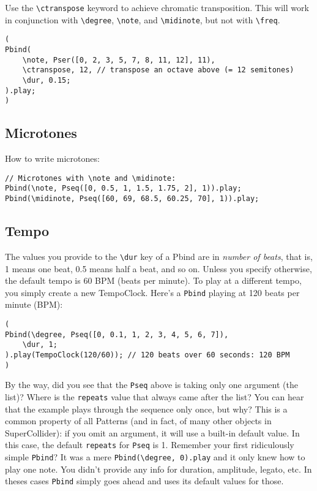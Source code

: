 Use the \texttt{\textbackslash ctranspose} keyword to achieve chromatic transposition. This will work in conjunction with \texttt{\textbackslash degree}, \texttt{\textbackslash note}, and \texttt{\textbackslash midinote}, but not with \texttt{\textbackslash freq}.

\begin{lstlisting}[style=SuperCollider-IDE, basicstyle=\scttfamily\footnotesize]
(
Pbind(
	\note, Pser([0, 2, 3, 5, 7, 8, 11, 12], 11),
	\ctranspose, 12, // transpose an octave above (= 12 semitones)
	\dur, 0.15;
).play;
)
\end{lstlisting}

\subsection{Microtones}
 
How to write microtones:

\begin{lstlisting}[style=SuperCollider-IDE, basicstyle=\scttfamily\footnotesize]
// Microtones with \note and \midinote:
Pbind(\note, Pseq([0, 0.5, 1, 1.5, 1.75, 2], 1)).play;
Pbind(\midinote, Pseq([60, 69, 68.5, 60.25, 70], 1)).play;
\end{lstlisting}
 
\subsection{Tempo}

The values you provide to the \texttt{\textbackslash dur} key of a Pbind are in \emph{number of beats}, that is, 1 means one beat, 0.5 means half a beat, and so on. Unless you specify otherwise, the default tempo is 60 BPM (beats per minute). To play at a different tempo, you simply create a new TempoClock. Here's a \texttt{Pbind} playing at 120 beats per minute (BPM):
 
\begin{lstlisting}[style=SuperCollider-IDE, basicstyle=\scttfamily\footnotesize]
(
Pbind(\degree, Pseq([0, 0.1, 1, 2, 3, 4, 5, 6, 7]),
	\dur, 1;
).play(TempoClock(120/60)); // 120 beats over 60 seconds: 120 BPM
)
\end{lstlisting}
 

By the way, did you see that the \texttt{Pseq} above is taking only one argument (the list)? Where is the \texttt{repeats} value that always came after the list? You can hear that the example plays through the sequence only once, but why? This is a common property of all Patterns (and in fact, of many other objects in SuperCollider): if you omit an argument, it will use a built-in default value. In this case, the default \texttt{repeats} for \texttt{Pseq} is 1. Remember your first ridiculously simple \texttt{Pbind}? It was a mere \texttt{Pbind(\textbackslash degree, 0).play} and it only knew how to play one note. You didn't provide any info for duration, amplitude, legato, etc. In theses cases \texttt{Pbind} simply goes ahead and uses its default values for those.

